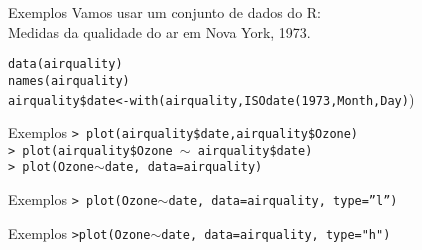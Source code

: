 \documentclass{beamer}
\begin{document}
\begin{frame}{Exemplos}
Vamos usar um conjunto de dados do R:\\ Medidas da qualidade do ar em Nova York, 1973.

\texttt{data(airquality)\\
names(airquality)\\
airquality\$date<-with(airquality,ISOdate(1973,Month,Day)})

\begin{table}[!htbp] \centering 
{}
\end{table}
\end{frame}

\begin{frame}{Exemplos}
\texttt{> plot(airquality\$date,airquality\$Ozone)\\
> plot(airquality\$Ozone $\sim$ airquality\$date)\\
> plot(Ozone$\sim$date, data=airquality)}

\centering
{}
\end{frame}

\begin{frame}{Exemplos}
\texttt{> plot(Ozone$\sim$date, data=airquality, type=''l'')}
\centering
{}
  
\end{frame}

\begin{frame}{Exemplos}
  \texttt{>plot(Ozone$\sim$date, data=airquality, type="h")}

  \begin{center}
     
  \end{center}

\end{frame}
\end{document}
